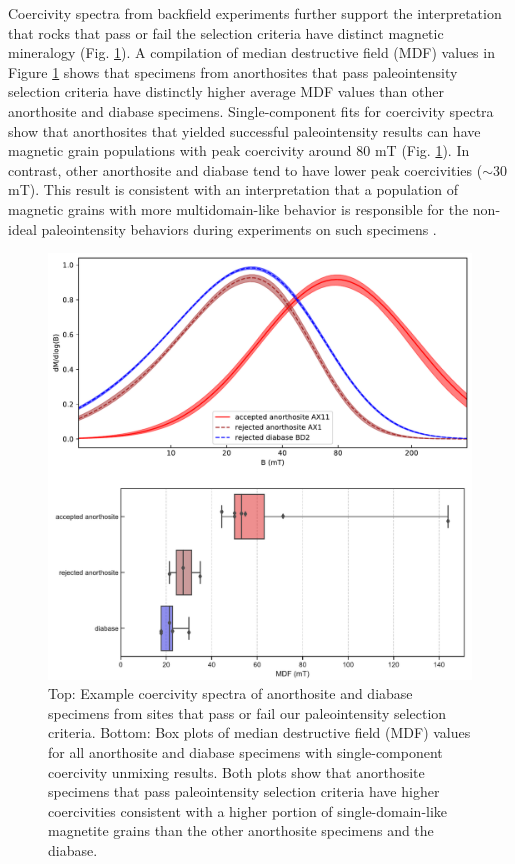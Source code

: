 \documentclass[9pt,twocolumn,twoside,lineno]{pnas-new}
\begin{document}
Coercivity spectra from backfield experiments further support the interpretation that rocks that pass or fail the selection criteria have distinct magnetic mineralogy (Fig. \ref{fig:coercivity}). A compilation of median destructive field (MDF) values in Figure \ref{fig:coercivity} shows that specimens from anorthosites that pass paleointensity selection criteria have distinctly higher average MDF values than other anorthosite and diabase specimens. Single-component fits for coercivity spectra \cite{Maxbauer2016a} show that anorthosites that yielded successful paleointensity results can have magnetic grain populations with peak coercivity around 80 mT (Fig. \ref{fig:coercivity}). In contrast, other anorthosite and diabase tend to have lower peak coercivities ($\sim$30 mT). This result is consistent with an interpretation that a population of magnetic grains with more multidomain-like behavior is responsible for the non-ideal paleointensity behaviors during experiments on such specimens \cite{Xu2004a}.

\begin{figure}
\noindent\includegraphics[width=\linewidth]{coercivity.pdf}
\centering
\caption{\footnotesize{Top: Example coercivity spectra of anorthosite and diabase specimens from sites that pass or fail our paleointensity selection criteria. Bottom: Box plots of median destructive field (MDF) values for all anorthosite and diabase specimens with single-component coercivity unmixing results. Both plots show that anorthosite specimens that pass paleointensity selection criteria have higher coercivities consistent with a higher portion of single-domain-like magnetite grains than the other anorthosite specimens and the diabase.}}
\label{fig:coercivity}
\end{figure}
\end{document}
